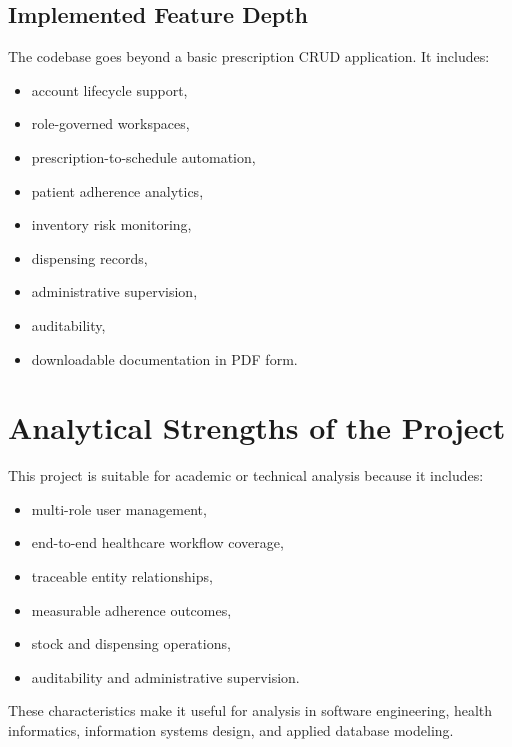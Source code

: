 \documentclass[12pt,a4paper]{article}
\begin{document}
\subsection{Implemented Feature Depth}
The codebase goes beyond a basic prescription CRUD application. It includes:
\begin{itemize}[leftmargin=*]
  \item account lifecycle support,
  \item role-governed workspaces,
  \item prescription-to-schedule automation,
  \item patient adherence analytics,
  \item inventory risk monitoring,
  \item dispensing records,
  \item administrative supervision,
  \item auditability,
  \item downloadable documentation in PDF form.
\end{itemize}

\section{Analytical Strengths of the Project}
This project is suitable for academic or technical analysis because it includes:
\begin{itemize}[leftmargin=*]
  \item multi-role user management,
  \item end-to-end healthcare workflow coverage,
  \item traceable entity relationships,
  \item measurable adherence outcomes,
  \item stock and dispensing operations,
  \item auditability and administrative supervision.
\end{itemize}

These characteristics make it useful for analysis in software engineering, health informatics, information systems design, and applied database modeling.
\end{document}
